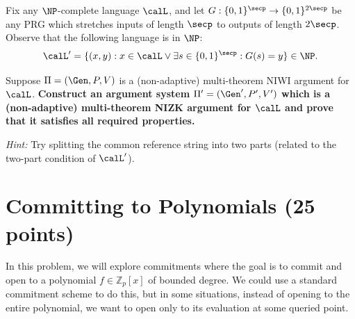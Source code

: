 \documentclass{article}
\begin{document}
Fix any $\NP$-complete language $\calL$, and let $G: \{0, 1\}^{\secp} \to \{0, 1\}^{2\secp}$ be any PRG which stretches inputs of length $\secp$ to outputs of length $2\secp$. Observe that the following language is in $\NP$:
    \[ \calL' = \{ (x, y): x \in \calL \lor \exists s \in \{0, 1\}^{\secp}: G(s) = y \} \in \NP. \]

Suppose $\Pi = (\Gen, P, V)$ is a (non-adaptive) multi-theorem NIWI argument for $\calL$. \textbf{Construct an argument system $\Pi' = (\Gen', P', V')$ which is a (non-adaptive) multi-theorem NIZK argument for $\calL$ and prove that it satisfies all required properties.} 

\emph{Hint:} Try splitting the common reference string into two parts (related to the two-part condition of $\calL'$).
\newpage
\section{Committing to Polynomials (25 points)}

In this problem, we will explore commitments where the goal is to commit and open to a polynomial $f \in \mathbb{Z}_p[x]$ of bounded degree. We could use a standard commitment scheme to do this, but in some situations, instead of opening to the entire polynomial, we want to open only to its evaluation at some queried point.
\end{document}
